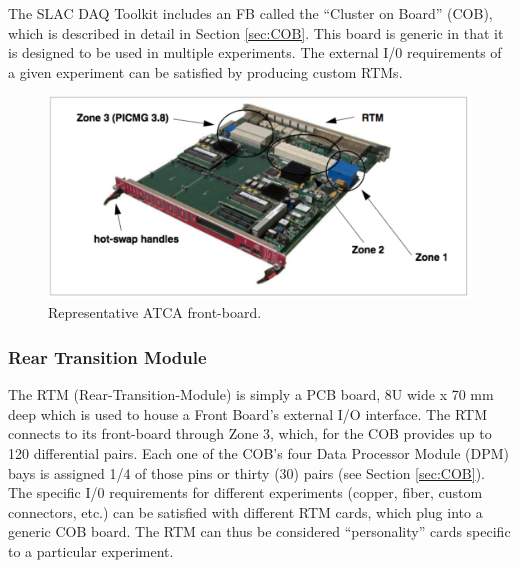 The SLAC DAQ Toolkit includes an FB called the ``Cluster on Board'' (COB), which is
described in detail in Section \ref{sec:COB}.
This board is generic in that it is designed to be used in multiple experiments.
The external I/0 requirements of a given experiment can be satisfied by producing 
custom RTMs.


\begin{figure}[tbh]
\includegraphics[scale=0.8]{front-boardpdf.pdf}
\caption{Representative ATCA front-board.}
\label{fig:frontBoard}
\end{figure} 

\subsubsection{Rear Transition Module}
\label{sec:rtm}
The RTM (Rear-Transition-Module) is simply a PCB board, 
8U wide x 70 mm deep which is used to house a Front Board's 
external I/O interface. 
The RTM connects to its front-board through Zone 3, which,
for the COB provides up to 120 differential pairs.
Each one of the COB's four Data Processor Module (DPM) bays 
is assigned 1/4 of those pins or thirty (30) pairs (see Section \ref{sec:COB}).
The specific I/0 requirements for different experiments (copper, fiber, custom 
connectors, etc.) can be satisfied with different RTM cards, which
plug into a generic COB board.
The RTM can thus 
be considered ``personality'' cards specific to a particular experiment. 


